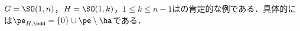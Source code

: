 \begin{cor}\label{cor:prob-eg}
  $G = \SO(1,n) $，$H = \SO(1,k) $，$1\leq k\leq n-1$はの肯定的な例である．具体的には$\pe_{H,\bdd} = \{0\}\cup \pe\setminus\ha $である．%
\end{cor}





